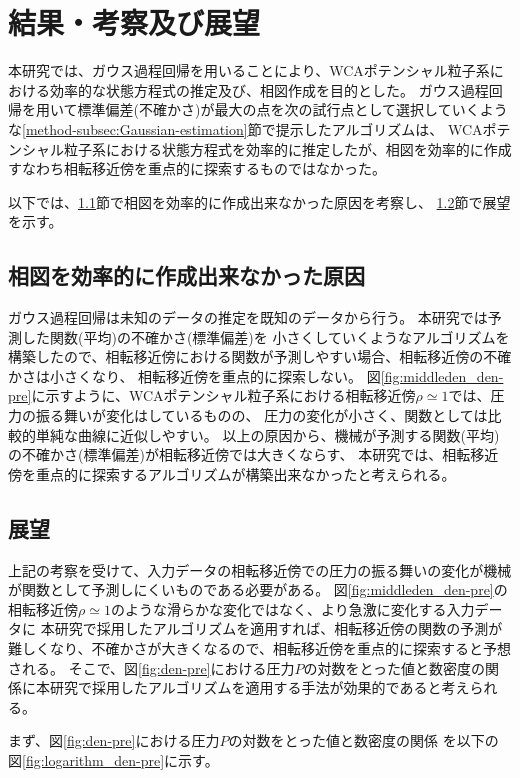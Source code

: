 \documentclass[titlepage]{jsreport}
\begin{document}
{{{\chapter{結果・考察及び展望} \label{chap:summary}

本研究では、ガウス過程回帰を用いることにより、WCAポテンシャル粒子系における効率的な状態方程式の推定及び、相図作成を目的とした。
ガウス過程回帰を用いて標準偏差(不確かさ)が最大の点を次の試行点として選択していくような\ref{method-subsec:Gaussian-estimation}節で提示したアルゴリズムは、
WCAポテンシャル粒子系における状態方程式を効率的に推定したが、相図を効率的に作成すなわち相転移近傍を重点的に探索するものではなかった。

以下では、\ref{sum-sec:cause}節で相図を効率的に作成出来なかった原因を考察し、
\ref{sum-sec:outlook}節で展望を示す。


\section{相図を効率的に作成出来なかった原因}\label{sum-sec:cause}
ガウス過程回帰は未知のデータの推定を既知のデータから行う。
本研究では予測した関数(平均)の不確かさ(標準偏差)を
小さくしていくようなアルゴリズムを構築したので、相転移近傍における関数が予測しやすい場合、相転移近傍の不確かさは小さくなり、
相転移近傍を重点的に探索しない。
図\ref{fig:middleden_den-pre}に示すように、WCAポテンシャル粒子系における相転移近傍${\rho}\simeq{1}$では、圧力の振る舞いが変化はしているものの、
圧力の変化が小さく、関数としては比較的単純な曲線に近似しやすい。
以上の原因から、機械が予測する関数(平均)の不確かさ(標準偏差)が相転移近傍では大きくならす、
本研究では、相転移近傍を重点的に探索するアルゴリズムが構築出来なかったと考えられる。

\section{展望}\label{sum-sec:outlook}
上記の考察を受けて、入力データの相転移近傍での圧力の振る舞いの変化が機械が関数として予測しにくいものである必要がある。
図\ref{fig:middleden_den-pre}の相転移近傍${\rho}\simeq{1}$のような滑らかな変化ではなく、より急激に変化する入力データに
本研究で採用したアルゴリズムを適用すれば、相転移近傍の関数の予測が難しくなり、不確かさが大きくなるので、相転移近傍を重点的に探索すると予想される。
そこで、図\ref{fig:den-pre}における圧力$P$の対数をとった値と数密度の関係に本研究で採用したアルゴリズムを適用する手法が効果的であると考えられる。

まず、図\ref{fig:den-pre}における圧力$P$の対数をとった値と数密度の関係
を以下の図\ref{fig:logarithm_den-pre}に示す。

}}}
\end{document}
